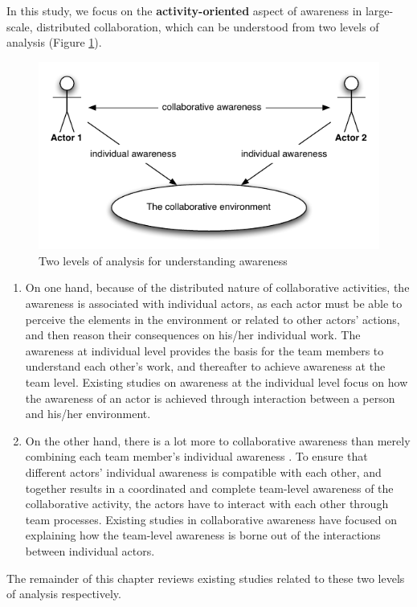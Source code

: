 In this study, we focus on the \textbf{activity-oriented} aspect of awareness in large-scale, distributed collaboration, which can be understood from two levels of analysis (Figure \ref{fig:two_levels_of_analysis}). 

\begin{figure}[htbp] %
   \centering
   \includegraphics{two_levels_of_analysis.pdf} 
   \caption{Two levels of analysis for understanding awareness}
   \label{fig:two_levels_of_analysis}
\end{figure}

\begin{enumerate}
   \item On one hand, because of the distributed nature of collaborative activities, the awareness is associated with individual actors, as each actor must be able to perceive the elements in the environment or related to other actors' actions, and then reason their consequences on his/her individual work. The awareness at individual level provides the basis for the team members to understand each other's work, and thereafter to achieve awareness at the team level. Existing studies on awareness at the individual level focus on how the awareness of an actor is achieved through interaction between a person and his/her environment.
   \item On the other hand, there is a lot more to collaborative awareness than merely combining each team member's individual awareness \cite{salas1995situation}. To ensure that different actors' individual awareness is compatible with each other, and together results in a coordinated and complete team-level awareness of the collaborative activity, the actors have to interact with each other through team processes. Existing studies in collaborative awareness have focused on explaining how the team-level awareness is borne out of the interactions between individual actors. 
\end{enumerate}
The remainder of this chapter reviews existing studies related to these two levels of analysis respectively.



